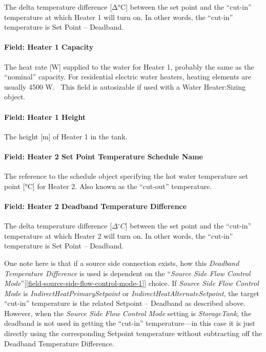 The delta temperature difference {[}Δ°C{]} between the set point and the ``cut-in'' temperature at which Heater 1 will turn on. In other words, the ``cut-in'' temperature is Set Point -- Deadband.

\paragraph{Field: Heater 1 Capacity}\label{field-heater-1-capacity}

The heat rate {[}W{]} supplied to the water for Heater 1, probably the same as the ``nominal'' capacity. For residential electric water heaters, heating elements are usually 4500 W.~ This field is autosizable if used with a Water Heater:Sizing object.

\paragraph{Field: Heater 1 Height}\label{field-heater-1-height}

The height {[}m{]} of Heater 1 in the tank.

\paragraph{Field: Heater 2 Set Point Temperature Schedule Name}\label{field-heater-2-set-point-temperature-schedule-name}

The reference to the schedule object specifying the hot water temperature set point {[}°C{]} for Heater 2. Also known as the ``cut-out'' temperature.

\paragraph{Field: Heater 2 Deadband Temperature Difference}\label{field-heater-2-deadband-temperature-difference}

The delta temperature difference {[}$\Delta{^\circ}C${]} between the set point and the ``cut-in'' temperature at which Heater 2 will turn on. In other words, the ``cut-in'' temperature is Set Point -- Deadband.

One note here is that if a source side connection exists, how this \emph{Deadband Temperature Difference} is used is dependent on the ``\emph{Source Side Flow Control Mode}''{[}\ref{field-source-side-flow-control-mode-1}{]} choice. If \emph{Source Side Flow Control Mode} is \emph{IndirectHeatPrimarySetpoint} or
\emph{IndirectHeatAlternateSetpoint}, the target ``cut-in'' temperature is the related Setpoint -- Deadband as described above. However, when the \emph{Source Side Flow Control Mode} setting is \emph{StorageTank}, the deadband is not used in getting the ``cut-in'' temperature---in this case it is just directly using the corresponding Setpoint temperature without subtracting off the Deadband Temperature Difference.

